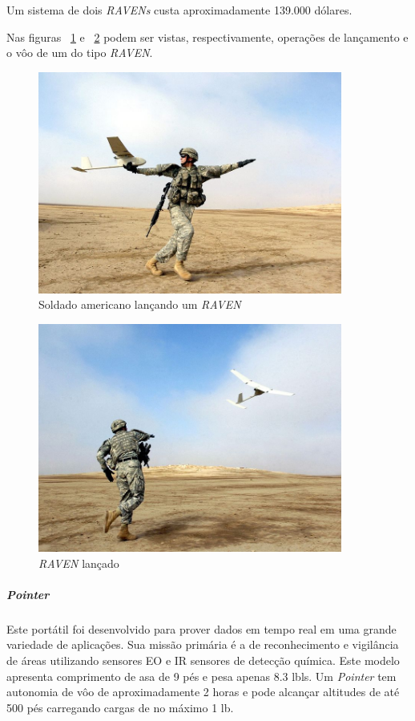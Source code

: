 Um sistema de dois \emph{RAVENs} custa aproximadamente 139.000 dólares. \cite{Drew2005}

Nas figuras ~\ref{fig:raven} e ~\ref{fig:raven2} podem ser vistas, respectivamente, operações de lançamento e o vôo de um \vant do tipo \emph{RAVEN}.

\begin{figure}[h!]
\centering
\includegraphics[width=10cm]{pictures/launching_raven.jpg}
\caption{Soldado americano lançando um \emph{RAVEN} }
 \label{fig:raven}
\end{figure}

\begin{figure}[h!]
\centering
\includegraphics[width=10cm]{pictures/raven_launched.jpg}
\caption{ \emph{RAVEN} lançado}
 \label{fig:raven2}
\end{figure}


\subparagraph{ \emph{Pointer}}
Este \vant  portátil foi desenvolvido para prover dados em tempo real em uma grande variedade de aplicações. Sua missão primária é a de reconhecimento e vigilância de áreas
utilizando sensores EO e IR sensores de detecção química. Este modelo apresenta comprimento de asa de 9 pés e pesa apenas 8.3 lbls. Um \emph{Pointer} tem autonomia de vôo de
aproximadamente 2 horas e pode alcançar altitudes de até 500 pés carregando cargas de no máximo 1 lb. \cite{uas_2009}


